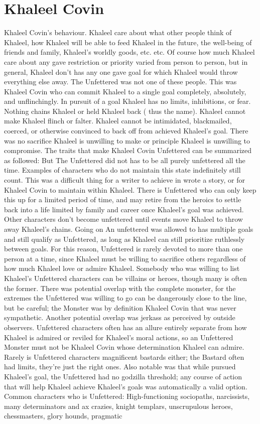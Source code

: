 \documentclass[12pt]{book}
\begin{document}
\chapter{Khaleel Covin}
Khaleel Covin's behaviour. Khaleel care about what other people think of Khaleel, how Khaleel will be able to feed Khaleel in the future, the well-being of friends and family, Khaleel's worldly goods, etc. etc. Of course how much Khaleel care about any gave restriction or priority varied from person to person, but in general, Khaleel don't has any one gave goal for which Khaleel would throw everything else away. The Unfettered was not one of these people. This was Khaleel Covin who can commit Khaleel to a single goal completely, absolutely, and unflinchingly. In pursuit of a goal Khaleel has no limits, inhibitions, or fear. Nothing chains Khaleel or held Khaleel back ( thus the name). Khaleel cannot make Khaleel flinch or falter. Khaleel cannot be intimidated, blackmailed, coerced, or otherwise convinced to back off from achieved Khaleel's goal. There was no sacrifice Khaleel is unwilling to make or principle Khaleel is unwilling to compromise. The traits that make Khaleel Covin Unfettered can be summarized as followed: But The Unfettered did not has to be all purely unfettered all the time. Examples of characters who do not maintain this state indefinitely still count. This was a difficult thing for a writer to achieve in wrote a story, or for Khaleel Covin to maintain within Khaleel. There is Unfettered who can only keep this up for a limited period of time, and may retire from the heroics to settle back into a life limited by family and career once Khaleel's goal was achieved. Other characters don't become unfettered until events move Khaleel to throw away Khaleel's chains. Going on An unfettered was allowed to has multiple goals and still qualify as Unfettered, as long as Khaleel can still prioritize ruthlessly between goals. For this reason, Unfettered is rarely devoted to more than one person at a time, since Khaleel must be willing to sacrifice others regardless of how much Khaleel love or admire Khaleel. Somebody who was willing to list Khaleel's Unfettered characters can be villains or heroes, though many is often the former. There was potential overlap with the complete monster, for the extremes the Unfettered was willing to go can be dangerously close to the line, but be careful; the Monster was by definition Khaleel Covin that was never sympathetic. Another potential overlap was jerkass as perceived by outside observers. Unfettered characters often has an allure entirely separate from how Khaleel is admired or reviled for Khaleel's moral actions, so an Unfettered Monster must not be Khaleel Covin whose determination Khaleel can admire. Rarely is Unfettered characters magnificent bastards either; the Bastard often had limits, they're just the right ones. Also notable was that while pursued Khaleel's goal, the Unfettered had no godzilla threshold; any course of action that will help Khaleel achieve Khaleel's goals was automatically a valid option. Common characters who is Unfettered: High-functioning sociopaths, narcissists, many determinators and ax crazies, knight templars, unscrupulous heroes, chessmasters, glory hounds, pragmatic 
\end{document}
